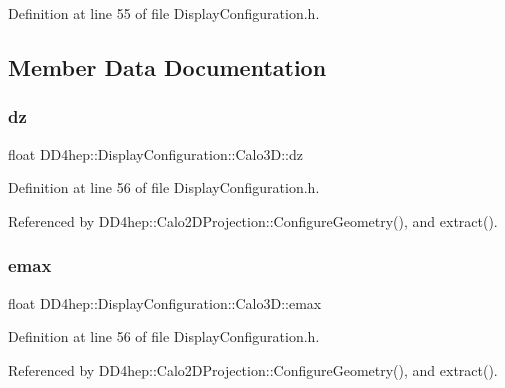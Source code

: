 Definition at line 55 of file Display\+Configuration.\+h.



\subsection{Member Data Documentation}
\hypertarget{struct_d_d4hep_1_1_display_configuration_1_1_calo3_d_a4c83ddd5abab41aede5327a47d1bffcc}{}\label{struct_d_d4hep_1_1_display_configuration_1_1_calo3_d_a4c83ddd5abab41aede5327a47d1bffcc} 
\subsubsection{\texorpdfstring{dz}{dz}}
{\footnotesize\ttfamily float D\+D4hep\+::\+Display\+Configuration\+::\+Calo3\+D\+::dz}



Definition at line 56 of file Display\+Configuration.\+h.



Referenced by D\+D4hep\+::\+Calo2\+D\+Projection\+::\+Configure\+Geometry(), and extract().

\hypertarget{struct_d_d4hep_1_1_display_configuration_1_1_calo3_d_a2a0ed0362e5b09927938df5c3d98d6b9}{}\label{struct_d_d4hep_1_1_display_configuration_1_1_calo3_d_a2a0ed0362e5b09927938df5c3d98d6b9} 
\subsubsection{\texorpdfstring{emax}{emax}}
{\footnotesize\ttfamily float D\+D4hep\+::\+Display\+Configuration\+::\+Calo3\+D\+::emax}



Definition at line 56 of file Display\+Configuration.\+h.



Referenced by D\+D4hep\+::\+Calo2\+D\+Projection\+::\+Configure\+Geometry(), and extract().

\hypertarget{struct_d_d4hep_1_1_display_configuration_1_1_calo3_d_ade7d636fe0552c821c519d838ec4e9cc}{}\label{struct_d_d4hep_1_1_display_configuration_1_1_calo3_d_ade7d636fe0552c821c519d838ec4e9cc} 
